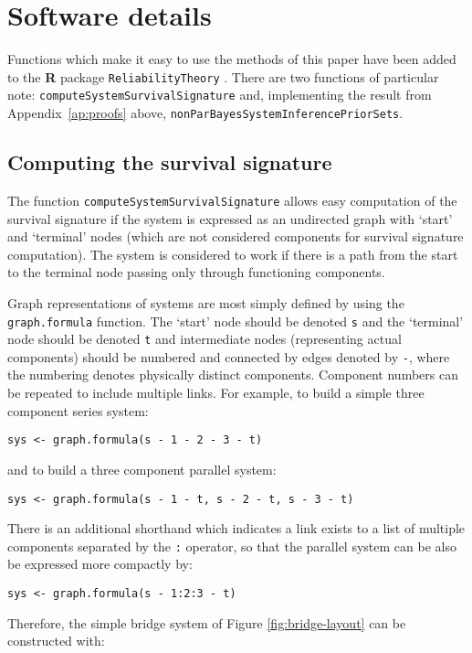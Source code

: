 \documentclass[12pt, a4paper]{elsarticle}
\begin{document}
\section{Software details}
\label{ap:software}

Functions which make it easy to use the methods of this paper
have been added to the \textbf{R} package \texttt{ReliabilityTheory} \citep{2015:aslett-RT}.
There are two functions of particular note: \texttt{computeSystemSurvivalSignature}
and, implementing the result from Appendix~\ref{ap:proofs} above, \texttt{nonParBayesSystemInferencePriorSets}.

\subsection{Computing the survival signature}

The function \texttt{computeSystemSurvivalSignature} allows easy 
computation of the survival signature if the system is expressed as an
undirected graph with `start' and `terminal' nodes (which are not
considered components for survival signature computation).  The system
is considered to work if there is a path from the start to the terminal
node passing only through functioning components.

Graph representations of systems are most simply defined by using the 
\texttt{graph.formula} function.  The `start' node should be denoted
\texttt{s} and the `terminal' node should be denoted \texttt{t} and
intermediate nodes (representing actual components) should be numbered and
connected by edges denoted by \texttt{-}, where the numbering denotes physically
distinct components.  Component numbers can be repeated to include
multiple links.  For example, to build a simple three component series
system:

\noindent\texttt{sys <- graph.formula(s\,-\,1\,-\,2\,-\,3\,-\,t)}

and to build a three component parallel system:

\noindent\texttt{sys <- graph.formula(s\,-\,1\,-\,t, s\,-\,2\,-\,t, s\,-\,3\,-\,t)}

There is an additional shorthand which indicates a link exists to a list of multiple components separated by the \texttt{:} operator, so that the parallel system can be also be expressed more compactly by:

\noindent\texttt{sys <- graph.formula(s\,-\,1:2:3\,-\,t)}

Therefore, the simple bridge system of Figure \ref{fig:bridge-layout} can be constructed with:
\end{document}

